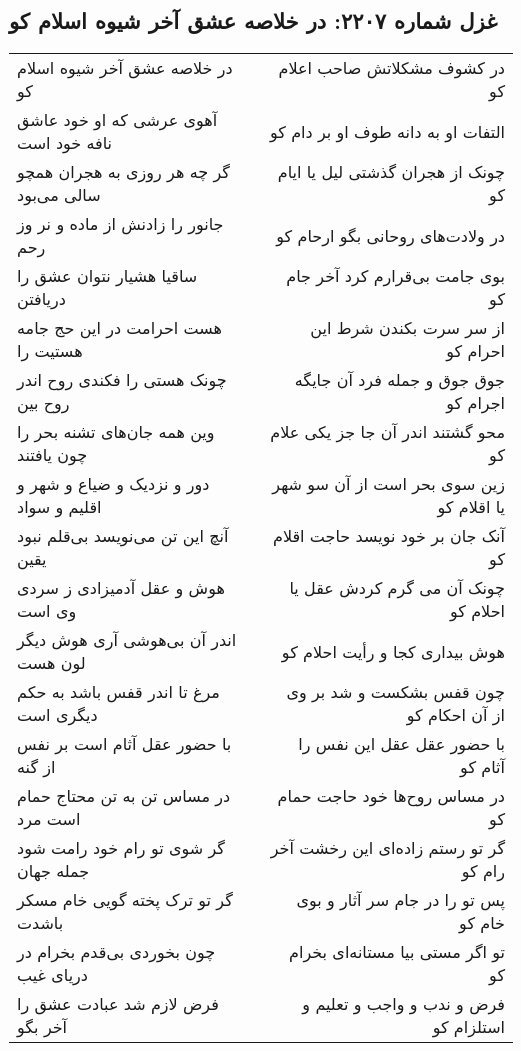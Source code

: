 \begin{center}
\section*{غزل شماره ۲۲۰۷: در خلاصه عشق آخر شیوه اسلام کو}
\label{sec:2207}
\begin{longtable}{l p{0.5cm} r}
در خلاصه عشق آخر شیوه اسلام کو
&&
در کشوف مشکلاتش صاحب اعلام کو
\\
آهوی عرشی که او خود عاشق نافه خود است
&&
التفات او به دانه طوف او بر دام کو
\\
گر چه هر روزی به هجران همچو سالی می‌بود
&&
چونک از هجران گذشتی لیل یا ایام کو
\\
جانور را زادنش از ماده و نر وز رحم
&&
در ولادت‌های روحانی بگو ارحام کو
\\
ساقیا هشیار نتوان عشق را دریافتن
&&
بوی جامت بی‌قرارم کرد آخر جام کو
\\
هست احرامت در این حج جامه هستیت را
&&
از سر سرت بکندن شرط این احرام کو
\\
چونک هستی را فکندی روح اندر روح بین
&&
جوق جوق و جمله فرد آن جایگه اجرام کو
\\
وین همه جان‌های تشنه بحر را چون یافتند
&&
محو گشتند اندر آن جا جز یکی علام کو
\\
دور و نزدیک و ضیاع و شهر و اقلیم و سواد
&&
زین سوی بحر است از آن سو شهر یا اقلام کو
\\
آنچ این تن می‌نویسد بی‌قلم نبود یقین
&&
آنک جان بر خود نویسد حاجت اقلام کو
\\
هوش و عقل آدمیزادی ز سردی وی است
&&
چونک آن می گرم کردش عقل یا احلام کو
\\
اندر آن بی‌هوشی آری هوش دیگر لون هست
&&
هوش بیداری کجا و رأیت احلام کو
\\
مرغ تا اندر قفس باشد به حکم دیگری است
&&
چون قفس بشکست و شد بر وی از آن احکام کو
\\
با حضور عقل آثام است بر نفس از گنه
&&
با حضور عقل عقل این نفس را آثام کو
\\
در مساس تن به تن محتاج حمام است مرد
&&
در مساس روح‌ها خود حاجت حمام کو
\\
گر شوی تو رام خود رامت شود جمله جهان
&&
گر تو رستم زاده‌ای این رخشت آخر رام کو
\\
گر تو ترک پخته گویی خام مسکر باشدت
&&
پس تو را در جام سر آثار و بوی خام کو
\\
چون بخوردی بی‌قدم بخرام در دریای غیب
&&
تو اگر مستی بیا مستانه‌ای بخرام کو
\\
فرض لازم شد عبادت عشق را آخر بگو
&&
فرض و ندب و واجب و تعلیم و استلزام کو

\end{longtable}
\end{center}

